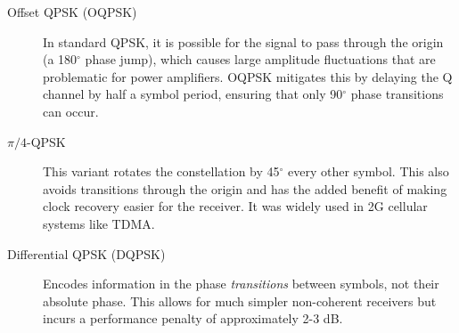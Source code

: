 \begin{description}
    \item[Offset QPSK (OQPSK)] In standard QPSK, it is possible for the signal to pass through the origin (a 180$^\circ$ phase jump), which causes large amplitude fluctuations that are problematic for power amplifiers. OQPSK mitigates this by delaying the Q channel by half a symbol period, ensuring that only 90$^\circ$ phase transitions can occur.
    \item[$\pi/4$-QPSK] This variant rotates the constellation by 45$^\circ$ every other symbol. This also avoids transitions through the origin and has the added benefit of making clock recovery easier for the receiver. It was widely used in 2G cellular systems like TDMA.
    \item[Differential QPSK (DQPSK)] Encodes information in the phase \emph{transitions} between symbols, not their absolute phase. This allows for much simpler non-coherent receivers but incurs a performance penalty of approximately 2-3 dB.
\end{description}


